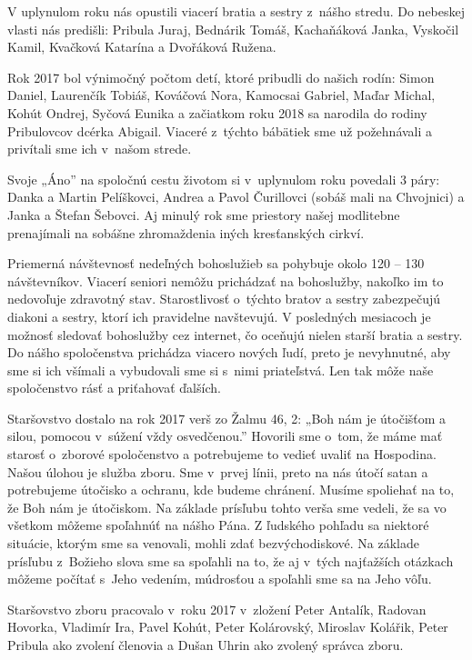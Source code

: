 V uplynulom roku nás opustili viacerí bratia a sestry z~nášho stredu. Do nebeskej vlasti nás predišli: Pribula Juraj, Bednárik Tomáš, Kachaňáková Janka, Vyskočil Kamil, Kvačková Katarína a Dvořáková Ružena.

Rok 2017 bol výnimočný počtom detí, ktoré pribudli do našich rodín: Simon Daniel, Laurenčík Tobiáš, Kováčová Nora, Kamocsai Gabriel, Maďar Michal, Kohút Ondrej, Syčová Eunika a začiatkom roku 2018 sa narodila do rodiny Pribulovcov dcérka Abigail. Viaceré z~týchto bábätiek sme už požehnávali a privítali sme ich v~našom strede.

Svoje „Áno” na spoločnú cestu životom si v~uplynulom roku povedali 3 páry: Danka a Martin Pelíškovci, Andrea a Pavol Čurillovci (sobáš mali na Chvojnici) a Janka a Štefan Šebovci. Aj minulý rok sme priestory našej modlitebne prenajímali na sobášne zhromaždenia iných kresťanských cirkví.

Priemerná návštevnosť nedeľných bohoslužieb sa pohybuje okolo 120 – 130 návštevníkov. Viacerí seniori nemôžu prichádzať na bohoslužby, nakoľko im to nedovoľuje zdravotný stav. Starostlivosť o~týchto bratov a sestry zabezpečujú diakoni a sestry, ktorí ich pravidelne navštevujú. V posledných mesiacoch je možnosť sledovať bohoslužby cez internet, čo oceňujú nielen starší bratia a sestry. Do nášho spoločenstva prichádza viacero nových ľudí, preto je nevyhnutné, aby sme si ich všímali a vybudovali sme si s~nimi priateľstvá. Len tak môže naše spoločenstvo rásť a priťahovať ďalších.


Staršovstvo dostalo na rok 2017 verš  zo Žalmu 46, 2: „Boh nám je útočišťom a silou, pomocou v~súžení vždy osvedčenou.” Hovorili sme o~tom, že máme mať starosť o~zborové spoločenstvo a potrebujeme to vedieť uvaliť na Hospodina. Našou úlohou je služba zboru.  Sme v~prvej línii, preto na nás útočí satan a potrebujeme útočisko a ochranu, kde budeme chránení. Musíme spoliehať na to, že Boh nám je útočiskom. Na základe prísľubu tohto verša sme vedeli, že sa vo všetkom môžeme spoľahnúť na nášho Pána. Z ľudského pohľadu sa niektoré situácie, ktorým sme sa venovali, mohli zdať bezvýchodiskové. Na základe prísľubu z~Božieho slova sme sa spoľahli na to, že aj v~tých najťažších otázkach môžeme počítať s~Jeho vedením, múdrosťou a spoľahli sme sa na Jeho vôľu.

Staršovstvo zboru pracovalo v~roku 2017 v~zložení Peter Antalík, Radovan Hovorka, Vladimír Ira, Pavel Kohút, Peter Kolárovský, Miroslav Kolářik, Peter Pribula ako zvolení členovia a Dušan Uhrin ako zvolený správca zboru.

